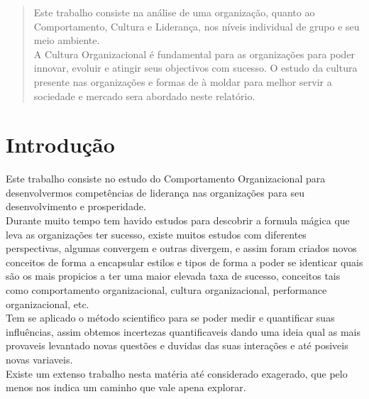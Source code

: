 
%

%
\tableofcontents
%
%
\pagestyle{plain} %
\newpage
\label{Resumo}
\begin{abstract} 
Este trabalho consiste na análise de uma organização, quanto ao Comportamento, Cultura e Liderança,
nos níveis individual de grupo e seu meio ambiente.\\

A Cultura Organizacional é fundamental para as organizações para poder innovar, evoluir e atingir seus objectivos com sucesso. O estudo da cultura presente nas organizações e formas de à moldar para melhor servir a sociedade e mercado sera abordado neste relatório.
\end{abstract}
\newpage
\section{Introdução}
Este trabalho consiste no estudo do Comportamento Organizacional para desenvolvermos competências de liderança nas organizações para seu desenvolvimento e prosperidade.\\

Durante muito tempo tem havido estudos para descobrir a formula mágica que leva as organizações ter sucesso, existe muitos estudos com diferentes perspectivas, algumas convergem e outras divergem, e assim foram criados novos conceitos de forma a encapsular estilos e tipos de forma a poder se identicar quais são os mais propicios a ter uma maior elevada taxa de sucesso, conceitos tais como comportamento organizacional, cultura organizacional, performance organizacional, etc.\\

Tem se aplicado o método scientifico para se poder medir e quantificar suas influências, assim obtemos incertezas quantificaveis dando uma ideia qual as mais provaveis levantado novas questões e duvidas das suas interações e até posiveis novas variaveis.\\

Existe um extenso trabalho nesta matéria até considerado exagerado, que pelo menos nos indica um caminho que vale apena explorar.\\


